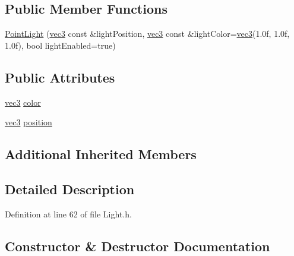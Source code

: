 \subsection*{Public Member Functions}
\begin{DoxyCompactItemize}
\item 
\hyperlink{struct_point_light_a0f855fe2861bb2372accfc6b93889067}{Point\+Light} (\hyperlink{_types_8h_a3d0ce73e3199de81565fb01632415288}{vec3} const \&light\+Position, \hyperlink{_types_8h_a3d0ce73e3199de81565fb01632415288}{vec3} const \&light\+Color=\hyperlink{_types_8h_a3d0ce73e3199de81565fb01632415288}{vec3}(1.\+0f, 1.\+0f, 1.\+0f), bool light\+Enabled=true)
\end{DoxyCompactItemize}
\subsection*{Public Attributes}
\begin{DoxyCompactItemize}
\item 
\hyperlink{_types_8h_a3d0ce73e3199de81565fb01632415288}{vec3} \hyperlink{struct_point_light_ab5b56bbc015365ca09c09b564dbeb7f2}{color}
\item 
\hyperlink{_types_8h_a3d0ce73e3199de81565fb01632415288}{vec3} \hyperlink{struct_point_light_a5dcffe608a4724ce024a3a3bc96c7585}{position}
\end{DoxyCompactItemize}
\subsection*{Additional Inherited Members}


\subsection{Detailed Description}


Definition at line 62 of file Light.\+h.



\subsection{Constructor \& Destructor Documentation}
